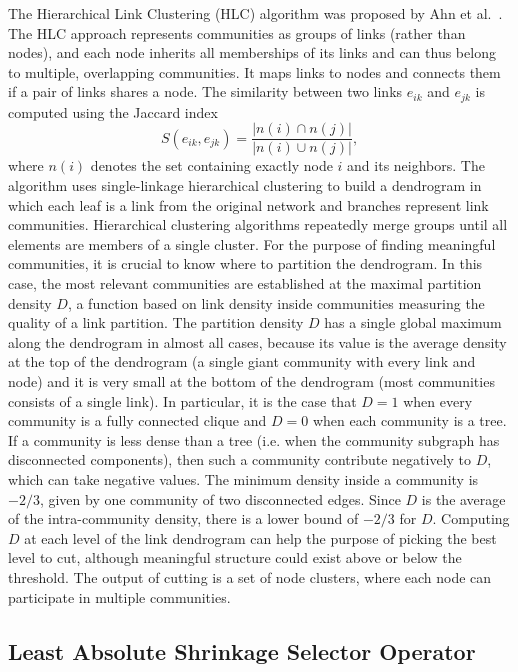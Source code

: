 The Hierarchical Link Clustering (HLC) algorithm was proposed by Ahn
et al.~\cite{ahn2010link}. The HLC approach represents communities as
groups of links (rather than nodes), and each node inherits all
memberships of its links and can thus belong to multiple, overlapping
communities. It maps links to nodes and connects them if a pair of
links shares a node. The similarity between two links $e_{ik}$ and
$e_{jk}$ is computed using the Jaccard index
%
\begin{equation}\label{eq:jaccard}
  S(e_{ik},e_{jk}) = \frac{\vert n(i) \cap n(j) \vert}{\vert n(i) \cup n(j) \vert},
\end{equation}
%
where $n(i)$ denotes the set containing exactly node $i$ and its
neighbors. The algorithm uses single-linkage hierarchical clustering
to build a dendrogram in which each leaf is a link from the original
network and branches represent link communities. Hierarchical
clustering algorithms repeatedly merge groups until all elements are
members of a single cluster. For the purpose of finding meaningful
communities, it is crucial to know where to partition the
dendrogram. In this case, the most relevant communities are
established at the maximal partition density $D$, a function based on
link density inside communities measuring the quality of a link
partition. The partition density $D$ has a single global maximum along
the dendrogram in almost all cases, because its value is the average
density at the top of the dendrogram (a single giant community with
every link and node) and it is very small at the bottom of the
dendrogram (most communities consists of a single link). In
particular, it is the case that $D = 1$ when every community is a
fully connected clique and $D = 0$ when each community is a tree. If a
community is less dense than a tree (i.e. when the community subgraph
has disconnected components), then such a community contribute
negatively to $D$, which can take negative values. The minimum density
inside a community is $-2/3$, given by one community of two
disconnected edges. Since $D$ is the average of the intra-community
density, there is a lower bound of $-2/3$ for $D$. Computing $D$ at
each level of the link dendrogram can help the purpose of picking the
best level to cut, although meaningful structure could exist above or
below the threshold. The output of cutting is a set of node clusters,
where each node can participate in multiple communities.

\subsection{Least Absolute Shrinkage Selector Operator}

